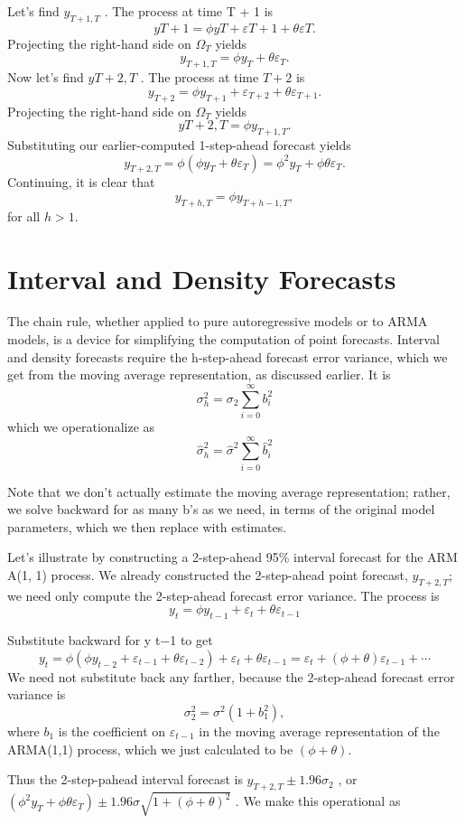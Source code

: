 \documentclass[]{article}
\begin{document}
Let's find \(y_{T +1,T}\) . The process at time T + 1 is
\[y T +1 = \phi y T + \varepsilon T +1 + \theta\varepsilon T .\]
Projecting the right-hand side on \(\Omega_T\) yields
\[y_{T +1,T} = \phi y _T + \theta\varepsilon _T .\] Now let's find
\(y{T +2,T}\) . The process at time \(T + 2\) is
\[y_{T+2} = \phi y _{T +1} + \varepsilon_{T+2} + \theta\varepsilon _{T +1 }.\]
Projecting the right-hand side on \(\Omega_T\) yields
\[y{T +2,T} = \phi y_{T +1,T} .\] Substituting our earlier-computed
1-step-ahead forecast yields
\[y_{T +2,T} = \phi (\phi y_ T + \theta\varepsilon_ T ) 
= \phi^2 y _T + \phi\theta\varepsilon _T .\] Continuing, it is clear
that \[y_{T +h,T} = \phi y_{T +h−1,T },\] for all \(h > 1\).

\hypertarget{interval-and-density-forecasts}{%
\section{Interval and Density
Forecasts}\label{interval-and-density-forecasts}}

The chain rule, whether applied to pure autoregressive models or to ARMA
models, is a device for simplifying the computation of point forecasts.
Interval and density forecasts require the h-step-ahead forecast error
variance, which we get from the moving average representation, as
discussed earlier. It is \[\sigma_h^2 
= \sigma_2\sum_{i=0}^\infty b_i^2\] which we operationalize as
\[\hat\sigma_h^2
= \hat\sigma^2
\sum_{i=0}^\infty \hat b_i^2\]

Note that we don't actually estimate the moving average representation;
rather, we solve backward for as many b's as we need, in terms of the
original model parameters, which we then replace with estimates.

Let's illustrate by constructing a 2-step-ahead 95\% interval forecast
for the ARM A(1, 1) process. We already constructed the 2-step-ahead
point forecast, \(y_{T +2,T}\); we need only compute the 2-step-ahead
forecast error variance. The process is
\[y_t = \phi y_{t−1} + \varepsilon_t + \theta\varepsilon_{t-1}\]

Substitute backward for y t−1 to get
\[y_t = \phi(\phi y_{t−2} + \varepsilon_{t-1} + \theta\varepsilon_{t−2 }) + \varepsilon_t + \theta\varepsilon_{t-1}= \varepsilon_t + (\phi + \theta)\varepsilon_{t-1} + \cdots\]
We need not substitute back any farther, because the 2-step-ahead
forecast error variance is \[\sigma _2^2 = \sigma^2 (1+b^2_1 ),\] where
\(b_1\) is the coefficient on \(\varepsilon_{t-1}\) in the moving
average representation of the ARMA(1,1) process, which we just
calculated to be \(( \phi + \theta )\).

Thus the 2-step-pahead interval forecast is
\(y_{T +2,T} \pm 1.96\sigma_2\) , or
\((\phi^2 y_T + \phi\theta\varepsilon_T ) \pm 1.96\sigma\sqrt{ 1 + (\phi + \theta)^2}\)
. We make this operational as
\end{document}
